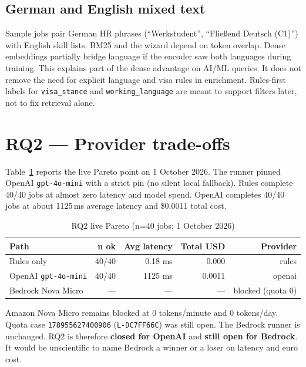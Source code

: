 \subsection{German and English mixed text}

Sample jobs pair German HR phrases (``Werkstudent'', ``Flie{\ss}end Deutsch (C1)'') with English skill lists. BM25 and the wizard depend on token overlap. Dense embeddings partially bridge language if the encoder saw both languages during training. This explains part of the dense advantage on AI/ML queries. It does not remove the need for explicit language and visa rules in enrichment. Rules-first labels for \texttt{visa\_stance} and \texttt{working\_language} are meant to support filters later, not to fix retrieval alone.

\section{RQ2 --- Provider trade-offs}
\label{sec:rq2}

Table~\ref{tab:rq2} reports the live Pareto point on 1 October 2026. The runner pinned OpenAI \texttt{gpt-4o-mini} with a strict pin (no silent local fallback). Rules complete 40/40 jobs at almost zero latency and  model spend. OpenAI completes 40/40 jobs at about 1125\,ms average latency and \$0.0011 total cost.

\begin{table}[ht]
\centering
\caption{RQ2 live Pareto (n=40 jobs; 1 October 2026)}
\label{tab:rq2}
\begin{tabular}{@{}lrrrr@{}}
\toprule
\textbf{Path} & \textbf{n ok} & \textbf{Avg latency} & \textbf{Total USD} & \textbf{Provider} \\
\midrule
Rules only & 40/40 & 0.18 ms & 0.000 & rules \\
OpenAI \texttt{gpt-4o-mini} & 40/40 & 1125 ms & 0.0011 & openai \\
Bedrock Nova Micro & --- & --- & --- & blocked (quota 0) \\
\bottomrule
\end{tabular}
\end{table}

Amazon Nova Micro remains blocked at 0 tokens/minute and 0 tokens/day. Quota case \texttt{178955627400906} (\texttt{L-DC7FF66C}) was still open. The Bedrock runner is unchanged. RQ2 is therefore \textbf{closed for OpenAI} and \textbf{still open for Bedrock}. It would be unscientific to name Bedrock a winner or a loser on latency and euro cost.

